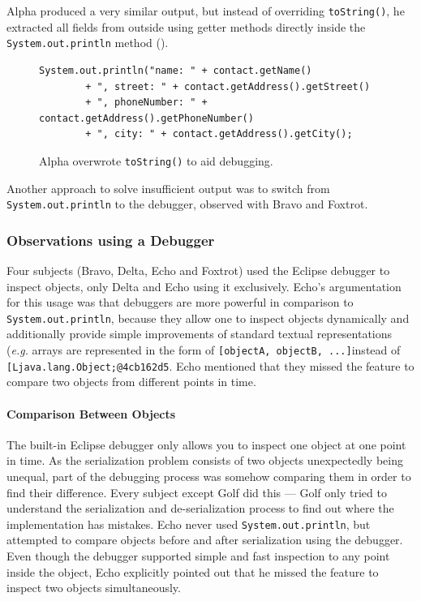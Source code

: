 \documentclass[english]{scrartcl}
\newcommand{\eg}{\emph{e.g.}\xspace}
\newcommand{\println}{\texttt{Sys\-tem.\-out.\-println}\xspace}
\begin{document}
Alpha produced a very similar output, but instead of overriding \texttt{toString()}, he extracted all fields from outside using getter methods directly inside the \println method ().

\begin{figure}[h]
\begin{lstlisting}
System.out.println("name: " + contact.getName()
		+ ", street: " + contact.getAddress().getStreet()
		+ ", phoneNumber: " + contact.getAddress().getPhoneNumber()
		+ ", city: " + contact.getAddress().getCity();
\end{lstlisting}
  \caption{Alpha overwrote \texttt{toString()} to aid debugging.}
\end{figure}

Another approach to solve insufficient output was to switch from \println to the debugger, observed with Bravo and Foxtrot.

\subsubsection{Observations using a Debugger}
Four subjects (Bravo, Delta, Echo and Foxtrot) used the Eclipse debugger to inspect objects, only Delta and Echo using it exclusively.
Echo's argumentation for this usage was that debuggers are more powerful in comparison to \println, because they allow one to inspect objects dynamically and additionally provide simple improvements of standard textual representations (\eg arrays are represented in the form of \texttt{[objectA, objectB, ...]}instead of \texttt{[Ljava.lang.Object;@4cb162d5}.
Echo mentioned that they missed the feature to compare two objects from different points in time.

\paragraph{Comparison Between Objects}
The built-in Eclipse debugger only allows you to inspect one object at one point in time.
As the serialization problem consists of two objects unexpectedly  being unequal, part of the debugging process was somehow comparing them in order to find their difference.
Every subject except Golf did this --- Golf only tried to understand the serialization and de-serialization process to find out where the implementation has mistakes.
Echo never used \println, but attempted to compare objects before and after serialization using the debugger.
Even though the debugger supported simple and fast inspection to any point inside the object, Echo explicitly pointed out that he missed the feature to inspect two objects simultaneously.
\end{document}
